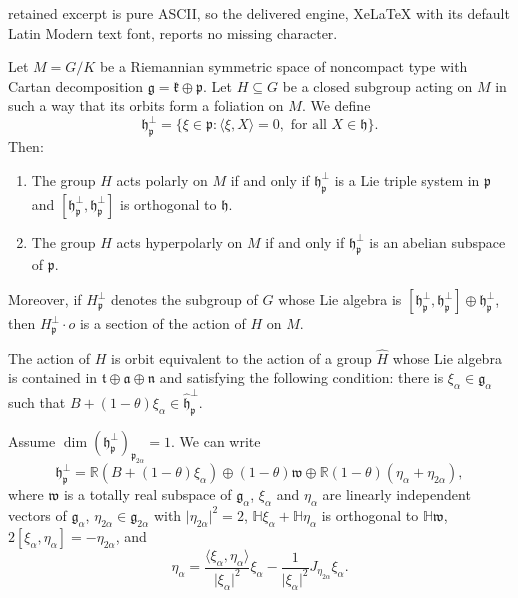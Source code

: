\documentclass[10pt,a4paper]{amsart}
\newcommand{\R}{\mathbb{R}}
\newcommand{\g}{\mathfrak}
\renewcommand{\H}{\mathbb{H}}
\begin{document}
retained excerpt is pure ASCII, so the delivered engine, XeLaTeX with its default Latin Modern text font, reports no missing character.
\begin{proposition}\label{th:criterion}
	Let $M=G/K$ be a Riemannian symmetric space of noncompact type with Cartan decomposition $\g{g}=\g{k}\oplus\g{p}$.
	Let $H\subseteq G$ be a closed subgroup acting on $M$ in such a way that its orbits form a foliation on $M$.
	We define
	\[
	\g{h}_\g{p}^\perp=\big\{\xi\in\g{p}:\langle\xi,X\rangle=0,\text{ for all $X\in\g{h}$}\big\}.
	\]
	Then:
	\begin{enumerate}[\rm (i)]
		\item The group $H$ acts polarly on $M$ if and only if $\g{h}_\g{p}^\perp$ is a Lie triple system in $\g{p}$ and $[\g{h}_\g{p}^\perp,\g{h}_\g{p}^\perp]$ is orthogonal to $\g{h}$.
		\item The group $H$ acts hyperpolarly on $M$ if and only if $\g{h}_\g{p}^\perp$ is an abelian subspace of $\g{p}$.
	\end{enumerate}
	Moreover, if $H_\g{p}^\perp$ denotes the subgroup of $G$ whose Lie algebra is $[\g{h}_\g{p}^\perp,\g{h}_\g{p}^\perp]\oplus\g{h}_{\g{p}}^{\perp}$, then $H_\g{p}^\perp\cdot o$ is a section of the action of $H$ on $M$.
\end{proposition}

\begin{lemma}\label{lemma:B+galpha}
    The action of $H$ is orbit equivalent to the action of a group $\hat{H}$ whose Lie algebra is contained in $\g{t}\oplus\g{a}\oplus\g{n}$ and satisfying the following condition: there is $\xi_\alpha\in\g{g}_\alpha$ such that $B+(1-\theta)\xi_\alpha\in\hat{\g{h}}_\g{p}^\perp$.
\end{lemma}

\begin{lemma}\label{lemma:spperp}
Assume $\dim(\g{h}_\g{p}^\perp)_{\g{p}_{2\alpha}}=1$.
We can write
\[
\g{h}_{\g{p}}^\perp
=\R(B+(1-\theta)\xi_\alpha)\oplus(1-\theta)\g{w}\oplus\R(1-\theta)(\eta_\alpha+\eta_{2\alpha}),
\]
where $\g{w}$ is a totally real subspace of $\g{g}_\alpha$, $\xi_\alpha$ and $\eta_\alpha$ are linearly independent vectors of $\g{g}_\alpha$, $\eta_{2\alpha}\in\g{g}_{2\alpha}$ with $\lvert\eta_{2\alpha}\rvert^2=2$, $\H\xi_\alpha+\H\eta_\alpha$ is orthogonal to $\H\g{w}$, 
$2[\xi_\alpha,\eta_\alpha]=-\eta_{2\alpha}$,
and
\[
\eta_\alpha
=\frac{\langle\xi_\alpha,\eta_\alpha\rangle}{\lvert\xi_\alpha\rvert^2}\xi_\alpha
-\frac{1}{\lvert\xi_\alpha\rvert^2}J_{\eta_{2\alpha}}\xi_\alpha.
\]
\end{lemma}
\end{document}
